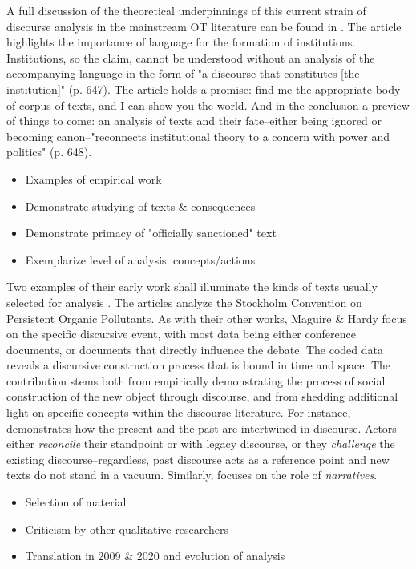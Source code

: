 A full discussion of the theoretical underpinnings of this current strain of discourse analysis in the mainstream OT literature can be found in \citet{Phillips2004}. The article highlights the importance of language for the formation of institutions. Institutions, so the claim, cannot be understood without an analysis of the accompanying language in the form of "a discourse that constitutes [the institution]" (p. 647). The article holds a promise: find me the appropriate body of corpus of texts, and I can show you the world. And in the conclusion a preview of things to come: an analysis of texts and their fate--either being ignored or becoming canon--"reconnects institutional theory to a concern with power and politics" (p. 648).

\begin{itemize}
	\item Examples of empirical work
	\item Demonstrate studying of texts \& consequences
	\item Demonstrate primacy of "officially sanctioned" text
	\item Exemplarize level of analysis: concepts/actions
\end{itemize} 

Two examples of their early work shall illuminate the kinds of texts usually selected for analysis \citep{Maguire2006,Hardy2010}. The articles analyze the Stockholm Convention on Persistent Organic Pollutants. As with their other works, Maguire \& Hardy focus on the specific discursive event, with most data being either conference documents, or documents that directly influence the debate. The coded data reveals a discursive construction process that is bound in time and space. The contribution stems both from empirically demonstrating the process of social construction of the new object through discourse, and from shedding additional light on specific concepts within the discourse literature. For instance, \citet{Maguire2006} demonstrates how the present and the past are intertwined in discourse. Actors either \textit{reconcile} their standpoint or with legacy discourse, or they \textit{challenge} the existing discourse--regardless, past discourse acts as a reference point and new texts do not stand in a vacuum. Similarly, \citet{Hardy2010} focuses on the role of \textit{narratives}.

\begin{itemize}
	\item Selection of material
	\item Criticism by other qualitative researchers
	\item Translation in 2009 \& 2020 and evolution of analysis 
\end{itemize} 

